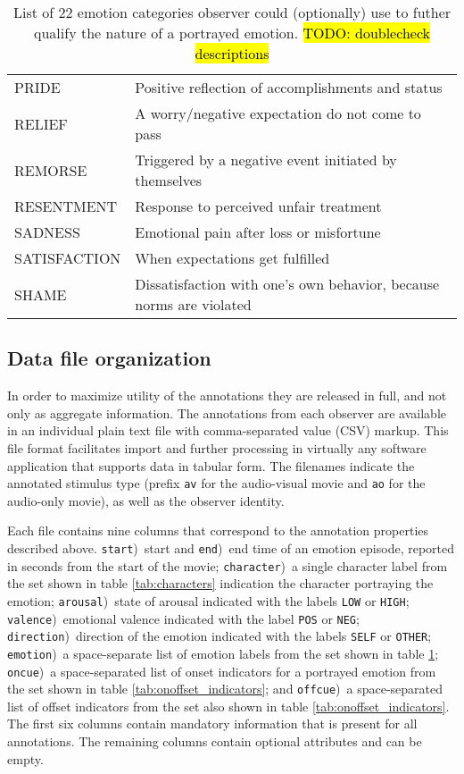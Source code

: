\begin{table}
\begin{tabular}{lp{10cm}}
    PRIDE & Positive reflection of accomplishments and status \\
    RELIEF & A worry/negative expectation do not come to pass \\
    REMORSE & Triggered by a negative event initiated by themselves \\
    RESENTMENT & Response to perceived unfair treatment \\
    SADNESS & Emotional pain after loss or misfortune \\
    SATISFACTION & When expectations get fulfilled \\
    SHAME & Dissatisfaction with one's own behavior, because norms are violated \\
  \end{tabular}
  \caption{List of 22 emotion categories observer could (optionally) use to
    futher qualify the nature of a portrayed emotion. \hl{TODO: doublecheck descriptions}}
  \label{tab:emotion_categories}
\end{table}



\subsection*{Data file organization}

In order to maximize utility of the annotations they are released in full, and
not only as aggregate information. The annotations from each observer are
available in an individual plain text file with comma-separated value (CSV)
markup. This file format facilitates import and further processing in virtually
any software application that supports data in tabular form. The filenames
indicate the annotated stimulus type (prefix \texttt{av} for the audio-visual
movie and \texttt{ao} for the audio-only movie), as well as the observer
identity.

Each file contains nine columns that correspond to the annotation properties
described above. \texttt{start})~start and \texttt{end})~end time of an emotion
episode, reported in seconds from the start of the movie; \texttt{character})~a
single character label from the set shown in table \ref{tab:characters}
indication the character portraying the emotion; \texttt{arousal})~state of
arousal indicated with the labels \texttt{LOW} or \texttt{HIGH};
\texttt{valence})~emotional valence indicated with the label \texttt{POS} or
\texttt{NEG}; \texttt{direction})~direction of the emotion indicated with the
labels \texttt{SELF} or \texttt{OTHER}; \texttt{emotion})~a space-separate list
of emotion labels from the set shown in table \ref{tab:emotion_categories};
\texttt{oncue})~a space-separated list of onset indicators for a portrayed
emotion from the set shown in table \ref{tab:onoffset_indicators}; and
\texttt{offcue})~a space-separated list of offset indicators from the set also
shown in table \ref{tab:onoffset_indicators}.  The first six columns contain
mandatory information that is present for all annotations. The remaining
columns contain optional attributes and can be empty.

